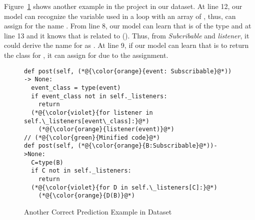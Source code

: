 Figure~\ref{example2} shows another example in the project
 in our dataset. At line 12, our model can recognize
the variable  used in a  loop with an array of
, thus, can assign for  the name
. From line 8, our model can learn that  is of
the type  and at line 13 and it knows that 
is related to  (). Thus, from {\em Subcribable}
and \emph{listener}, it could derive the name for  as
. At line 9, if our model can learn that  is to
return the class for , it can assign 
 for  due to the assignment.

\begin{figure}[t]
	\centering {} \begin{lstlisting}[]
def post(self, (*@{\color{orange}{event: Subscribable}@*)) -> None:
  event_class = type(event)
  if event_class not in self._listeners:
    return
  (*@{\color{violet}{for listener in self.\_listeners[event\_class]:}@*)
    (*@{\color{orange}{listener(event)}@*)
// (*@{\color{green}{Minified code}@*)
def post(self, (*@{\color{orange}{B:Subscribable}@*))->None:
  C=type(B)
  if C not in self._listeners:
    return
  (*@{\color{violet}{for D in self.\_listeners[C]:}@*)
    (*@{\color{orange}{D(B)}@*)
\end{lstlisting}
\vspace{-16pt}
\caption{Another Correct Prediction Example in Dataset}
\label{example2}
\end{figure}
